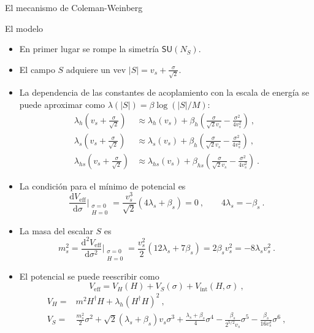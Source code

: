 \documentclass{beamer}
\newcommand{\dif}{\mathrm{d}}
\begin{document}
\begin{frame}{El mecanismo de Coleman-Weinberg}
\begin{frame}{El modelo}
\begin{itemize}
\item<only@2> En primer lugar se rompe la simetría $\mathsf{SU}(N_S)$.
\item<only@2> El campo $S$ adquiere un vev $|S| = v_s + \frac{\sigma}{\sqrt{2}}$.
\item<only@2> La dependencia de las constantes de acoplamiento con la escala de energía se puede aproximar como $\lambda(|S|) = \beta \log(|S|/M)$:
\begin{subequations}
\begin{align}
\lambda_h\left(v_s + \frac{\sigma}{\sqrt{2}}\right) &\approx \lambda_h(v_s) + \beta_h \left(\frac{\sigma}{\sqrt{2}v_s}-\frac{\sigma^2}{4 v_s^2}\right)\ ,\\
\lambda_s\left(v_s + \frac{\sigma}{\sqrt{2}}\right) &\approx \lambda_s(v_s) + \beta_h \left(\frac{\sigma}{\sqrt{2}v_s}-\frac{\sigma^2}{4 v_s^2}\right)\ ,\\
\lambda_{hs}\left(v_s + \frac{\sigma}{\sqrt{2}}\right) &\approx \lambda_{hs}(v_s) + \beta_{hs} \left(\frac{\sigma}{\sqrt{2}v_s}-\frac{\sigma^2}{4 v_s^2}\right)\ .
\end{align}
\end{subequations}
\item<only@3> La condición para el mínimo de potencial es
\begin{equation}
\frac{\dif V_\mathrm{eff}}{\dif \sigma}\Big|_{\substack{\sigma=0\\ H=0}} = \frac{v_s^3}{\sqrt{2}}(4\lambda_s + \beta_s) = 0\ ,  \qquad 4\lambda_s = - \beta_s \ . \label{eq:minimum}
\end{equation}
\item<only@3> La masa del escalar $S$ es 
\begin{equation}
m_s^2 = \frac{\dif^2 V_\mathrm{eff}}{\dif \sigma^2}\Big|_{\substack{\sigma=0\\ H=0}} \! =\frac{v_s^2}{2} (12 \lambda_s +7\beta_s) =2\beta_s v_s^2 = -8 \lambda_s v_s^2\ .
\end{equation}
\item<only@4> El potencial se puede reescribir como
\begin{equation}
V_\mathrm{eff} = V_H (H) + V_S (\sigma) + V_\mathrm{int}(H, \sigma)\ ,
\end{equation}
\begin{subequations}
\begin{align}
V_H =& m^2 H^\dagger H + \lambda_h (H^\dagger H)^2\label{eq:quadraticCW}\ , \\
V_S =& \frac{m_s^2}{2} \sigma^2 + \sqrt{2}(\lambda_s \!\!+\!\!\beta_s)v_s \sigma^3 + \frac{\lambda_s \!\!+\!\!\beta_s}{4}\sigma^4 - \frac{\beta_s}{2^{5/2} v_s}\sigma^5 - \frac{\beta_s}{16 v_s^2}\sigma^6\  \label{eq:Spotential},\\

\end{align}
\end{subequations}
\end{itemize}
\end{frame}
\end{frame}
\end{document}
